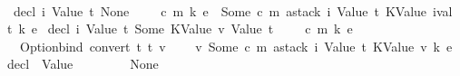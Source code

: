 \begin{isabellebody}
\ \ \isanewline
\isanewline
\ \ {\isachardoublequoteopen}decl\ i\ {\isacharparenleft}{\kern0pt}Value\ t{\isacharparenright}{\kern0pt}\ None\ {\isacharunderscore}{\kern0pt}\ {\isacharunderscore}{\kern0pt}\ {\isacharunderscore}{\kern0pt}\ {\isacharunderscore}{\kern0pt}\ {\isacharparenleft}{\kern0pt}c{\isacharcomma}{\kern0pt}\ m{\isacharcomma}{\kern0pt}\ k{\isacharcomma}{\kern0pt}\ e{\isacharparenright}{\kern0pt}\ {\isacharequal}{\kern0pt}\ Some\ {\isacharparenleft}{\kern0pt}c{\isacharcomma}{\kern0pt}\ m{\isacharcomma}{\kern0pt}\ {\isacharparenleft}{\kern0pt}astack\ i\ {\isacharparenleft}{\kern0pt}Value\ t{\isacharparenright}{\kern0pt}\ {\isacharparenleft}{\kern0pt}KValue\ {\isacharparenleft}{\kern0pt}ival\ t{\isacharparenright}{\kern0pt}{\isacharparenright}{\kern0pt}\ {\isacharparenleft}{\kern0pt}k{\isacharcomma}{\kern0pt}\ e{\isacharparenright}{\kern0pt}{\isacharparenright}{\kern0pt}{\isacharparenright}{\kern0pt}{\isachardoublequoteclose}\isanewline
{\isacharbar}{\kern0pt}\ {\isachardoublequoteopen}decl\ i\ {\isacharparenleft}{\kern0pt}Value\ t{\isacharparenright}{\kern0pt}\ {\isacharparenleft}{\kern0pt}Some\ {\isacharparenleft}{\kern0pt}KValue\ v{\isacharcomma}{\kern0pt}\ Value\ t{\isacharprime}{\kern0pt}{\isacharparenright}{\kern0pt}{\isacharparenright}{\kern0pt}\ {\isacharunderscore}{\kern0pt}\ {\isacharunderscore}{\kern0pt}\ {\isacharunderscore}{\kern0pt}\ {\isacharunderscore}{\kern0pt}\ {\isacharparenleft}{\kern0pt}c{\isacharcomma}{\kern0pt}\ m{\isacharcomma}{\kern0pt}\ k{\isacharcomma}{\kern0pt}\ e{\isacharparenright}{\kern0pt}\ {\isacharequal}{\kern0pt}\isanewline
\ \ \ Option{\isachardot}{\kern0pt}bind\ {\isacharparenleft}{\kern0pt}convert\ t{\isacharprime}{\kern0pt}\ t\ v{\isacharparenright}{\kern0pt}\isanewline
\ \ \ \ {\isacharparenleft}{\kern0pt}{\isasymlambda}v{\isacharprime}{\kern0pt}{\isachardot}{\kern0pt}\ Some\ {\isacharparenleft}{\kern0pt}c{\isacharcomma}{\kern0pt}\ m{\isacharcomma}{\kern0pt}\ astack\ i\ {\isacharparenleft}{\kern0pt}Value\ t{\isacharparenright}{\kern0pt}\ {\isacharparenleft}{\kern0pt}KValue\ v{\isacharprime}{\kern0pt}{\isacharparenright}{\kern0pt}\ {\isacharparenleft}{\kern0pt}k{\isacharcomma}{\kern0pt}\ e{\isacharparenright}{\kern0pt}{\isacharparenright}{\kern0pt}{\isacharparenright}{\kern0pt}{\isachardoublequoteclose}\isanewline
{\isacharbar}{\kern0pt}\ {\isachardoublequoteopen}decl\ {\isacharunderscore}{\kern0pt}\ {\isacharparenleft}{\kern0pt}Value\ {\isacharunderscore}{\kern0pt}{\isacharparenright}{\kern0pt}\ {\isacharunderscore}{\kern0pt}\ {\isacharunderscore}{\kern0pt}\ {\isacharunderscore}{\kern0pt}\ {\isacharunderscore}{\kern0pt}\ {\isacharunderscore}{\kern0pt}\ {\isacharunderscore}{\kern0pt}\ {\isacharequal}{\kern0pt}\ None{\isachardoublequoteclose}\isanewline

\end{isabellebody}
